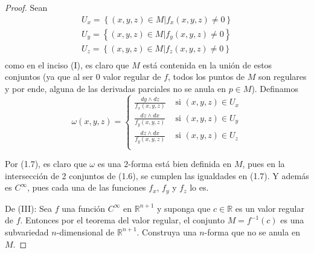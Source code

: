 \documentclass[12pt]{report}
\theoremstyle{largebreak}
\begin{document}
\begin{proof}
        Sean
        \begin{equation}
            \begin{split}
                U_x=\left\{(x,y,z)\in M|f_x(x,y,z)\neq0\right\}\\
                U_y=\left\{(x,y,z)\in M|f_y(x,y,z)\neq0\right\}\\
                U_z=\left\{(x,y,z)\in M|f_z(x,y,z)\neq0\right\}\\
            \end{split}
        \end{equation}
        como en el inciso (I), es claro que $M$ está contenida en la unión de estos conjuntos (ya que al ser 0 valor regular de $f$, todos los puntos de $M$ son regulares y por ende, alguna de las derivadas parciales no se anula en $p\in M$). Definamos
        \begin{equation}
            \omega(x,y,z)=\left\{
                \begin{aligned}
                    \frac{dy\wedge dz}{f_x(x,y,z)} & \text{ si }(x,y,z)\in U_x\\
                    \frac{dz\wedge dx}{f_y(x,y,z)} & \text{ si }(x,y,z)\in U_y\\
                    \frac{dz\wedge dx}{f_y(x,y,z)} & \text{ si }(x,y,z)\in U_z\\
                \end{aligned}
            \right.
        \end{equation}

        Por (1.7), es claro que $\omega$ es una $2$-forma está bien definida en $M$, pues en la intersección de 2 conjuntos de (1.6), se cumplen las igualdades en (1.7). Y además es $C^\infty$, pues cada una de las funciones $f_x$, $f_y$ y $f_z$ lo es.

        De (III): Sea $f$ una función $C^\infty$ en $\mathbb{R}^{n+1}$ y suponga que $c\in\mathbb{R}$ es un valor regular de $f$. Entonces por el teorema del valor regular, el conjunto $M=f^{-1}(c)$ es una subvariedad $n$-dimensional de $\mathbb{R}^{n+1}$. Construya una $n$-forma que no se anula en $M$.


\end{proof}
\end{document}
